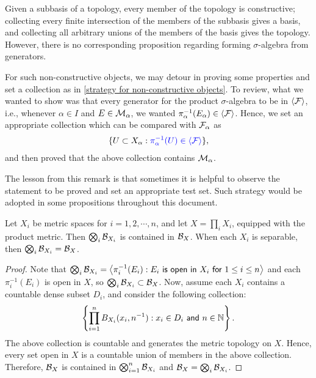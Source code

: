 \begin{rmk}
    Given a subbasis of a topology, every member of the topology is constructive; collecting every finite intersection of the members of the subbasis gives a basis, and collecting all arbitrary unions of the members of the basis gives the topology.
    However, there is no corresponding proposition regarding forming $\sigma$-algebra from generators.

    For such non-constructive objects, we may detour in proving some properties and set a collection as in \cref{strategy for non-constructive objects}.
    To review, \color{magenta}what we wanted to show was that every generator for the product $\sigma$-algebra to be in ${\left\langle{{\mathcal{F}}}\right\rangle}$\color{black}, i.e., whenever $\alpha\in I$ and $E\in{\mathcal{M}}_\alpha$, we wanted \color{blue}$\pi_\alpha^{-1}(E_\alpha)\in{\left\langle{{\mathcal{F}}}\right\rangle}$\color{black}.
    Hence, we set an appropriate collection \color{magenta}which can be compared with ${\mathcal{F}}_\alpha$ \color{black} as
    \begin{align*}
        \{U\subset X_\alpha: \color{blue}\pi_\alpha^{-1}(U)\in{\left\langle{{\mathcal{F}}}\right\rangle}\color{black}\},
    \end{align*}
    and then proved that the above collection contains ${\mathcal{M}}_\alpha$.

    The lesson from this remark is that sometimes it is helpful to observe the statement to be proved and set an appropriate test set.
    Such strategy would be adopted in some propositions throughout this document.
\end{rmk}

\begin{prop}
    Let $X_i$ be metric spaces for $i=1, 2, \cdots, n$, and let $X=\prod_i X_i$, equipped with the product metric.
    Then $\bigotimes_i {\mathcal{B}}_{X_i}$ is contained in ${\mathcal{B}}_X$.
    When each $X_i$ is separable, then $\bigotimes_i {\mathcal{B}}_{X_i}={\mathcal{B}}_X$.
\end{prop}
\begin{proof}
    Note that $\bigotimes_i {\mathcal{B}}_{X_i}={\left\langle{\pi_i^{-1}(E_i):\textsf{$E_i$ is open in $X_i$ for $1\leq i\leq n$}}\right\rangle}$ and each $\pi_i^{-1}(E_i)$ is open in $X$, so $\bigotimes_i {\mathcal{B}}_{X_i}\subset{\mathcal{B}}_X$.
    Now, assume each $X_i$ contains a countable dense subset $D_i$, and consider the following collection:
    \begin{align*}
        \left\{
        \prod_{i=1}^n B_{X_i}(x_i, n^{-1})
        :
        \textsf{$x_i\in D_i$ and $n\in{\mathbb{N}}$}
        \right\}.
    \end{align*}
    The above collection is countable and generates the metric topology on $X$.
    Hence, every set open in $X$ is a countable union of members in the above collection.
    Therefore, ${\mathcal{B}}_X$ is contained in $\bigotimes_{i=1}^n {\mathcal{B}}_{X_i}$ and ${\mathcal{B}}_X=\bigotimes_i{\mathcal{B}}_{X_i}$.
\end{proof}
